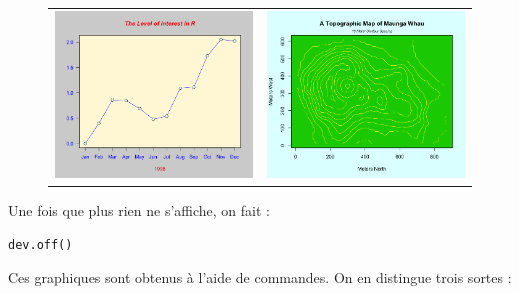 \begin{figure}[H]
\begin{center}
\begin{tabular}{cc}
\includegraphics[scale=0.25]{ilu/gra3.png} &
\includegraphics[scale=0.25]{ilu/gra4.png} \\
\end{tabular}
\end{center}
\end{figure}
Une fois que plus rien ne s'affiche, on fait :
\begin{lstlisting}[language=html]
dev.off()
\end{lstlisting}
Ces graphiques sont obtenus à l'aide de commandes. On en distingue trois sortes :
